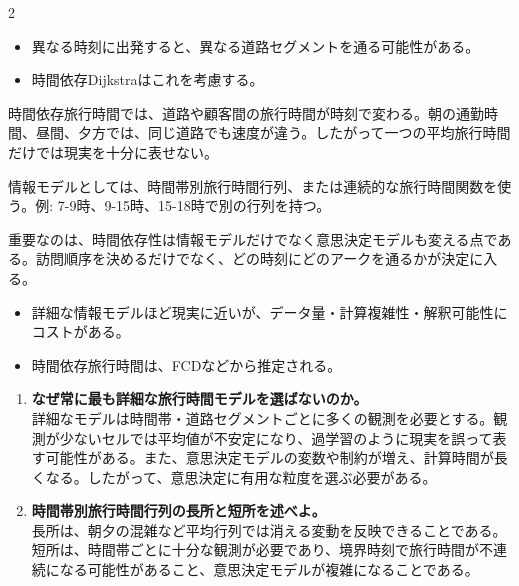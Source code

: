 \clearpage
{}
\begin{multicols}{2}\footnotesize\raggedcolumns
{}
\begin{itemize}
\item 異なる時刻に出発すると、異なる道路セグメントを通る可能性がある。
\item 時間依存Dijkstraはこれを考慮する。
\end{itemize}
時間依存旅行時間では、道路や顧客間の旅行時間が時刻で変わる。朝の通勤時間、昼間、夕方では、同じ道路でも速度が違う。したがって一つの平均旅行時間だけでは現実を十分に表せない。\par

情報モデルとしては、時間帯別旅行時間行列、または連続的な旅行時間関数を使う。例: 7-9時、9-15時、15-18時で別の行列を持つ。\par

重要なのは、時間依存性は情報モデルだけでなく意思決定モデルも変える点である。訪問順序を決めるだけでなく、どの時刻にどのアークを通るかが決定に入る。\par
{}
\begin{itemize}
\item 詳細な情報モデルほど現実に近いが、データ量・計算複雑性・解釈可能性にコストがある。
\item 時間依存旅行時間は、FCDなどから推定される。
\end{itemize}
\begin{enumerate}
\item \textbf{なぜ常に最も詳細な旅行時間モデルを選ばないのか。}\\詳細なモデルは時間帯・道路セグメントごとに多くの観測を必要とする。観測が少ないセルでは平均値が不安定になり、過学習のように現実を誤って表す可能性がある。また、意思決定モデルの変数や制約が増え、計算時間が長くなる。したがって、意思決定に有用な粒度を選ぶ必要がある。
\item \textbf{時間帯別旅行時間行列の長所と短所を述べよ。}\\長所は、朝夕の混雑など平均行列では消える変動を反映できることである。短所は、時間帯ごとに十分な観測が必要であり、境界時刻で旅行時間が不連続になる可能性があること、意思決定モデルが複雑になることである。
\end{enumerate}
\end{multicols}

